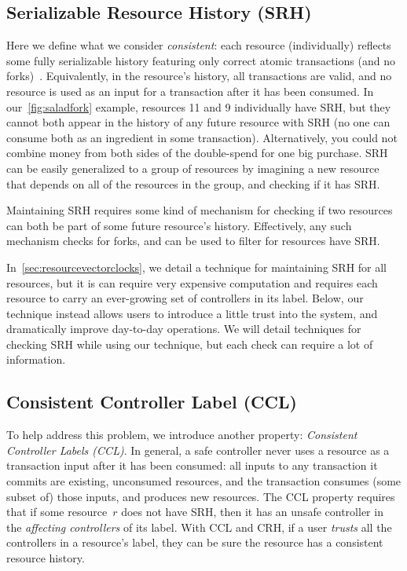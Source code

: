 \documentclass[a4paper,USenglish,cleveref, autoref, thm-restate, anonymous]{lipics-v2021}
\begin{document}
\subsection{Serializable Resource History (SRH)}
Here we define what we consider \emph{consistent}: each resource (individually) reflects some fully serializable history featuring only correct atomic transactions (and no forks)~\cite{serializability}. 
Equivalently, in the resource's history, all transactions are valid, and no resource is used as an input for a transaction after it has been consumed. 
In our~\cref{fig:saladfork} example, resources 11 and 9 individually have SRH, but they cannot both appear in the history of any future resource with SRH (no one can consume both as an ingredient in some transaction).
Alternatively, you could not combine money from both sides of the double-spend for one big purchase.
SRH can be easily generalized to a group of resources by imagining a new resource that depends on all of the resources in the group, and checking if it has SRH.

Maintaining SRH requires some kind of mechanism for checking if two resources can both be part of some future resource's history. 
Effectively, any such mechanism checks for forks, and can be used to filter for resources have SRH.


In~\cref{sec:resourcevectorclocks}, we detail a technique for maintaining SRH for all resources, but it is can require very expensive computation and requires each resource to carry an ever-growing set of controllers in its label. 
Below, our technique instead allows users to introduce a little trust into the system, and dramatically improve day-to-day operations.
We will detail techniques for checking SRH while using our technique, but each check can require a lot of information.

\subsection{Consistent Controller Label (CCL)}
To help address this problem, we introduce another property: \emph{Consistent Controller Labels (CCL)}.
In general, a safe controller never uses a resource as a transaction input after it has been consumed: all inputs to any transaction it commits are existing,  unconsumed resources, and the transaction consumes (some subset of) those inputs, and produces new resources. 
The CCL property requires that if some resource~$r$ does not have SRH, then it has an unsafe controller in the \textit{affecting controllers} of its label.
With CCL and CRH, if a user \textit{trusts} all the controllers in a resource's label, they can be sure the resource has a consistent resource history. 
\end{document}
